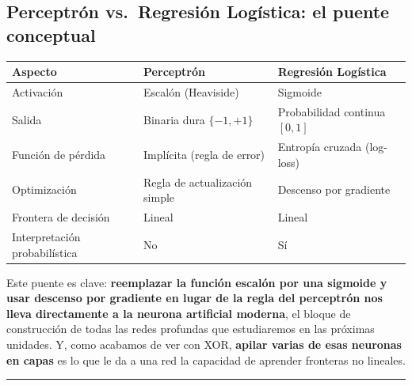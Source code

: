 \documentclass[
  letterpaper,
  DIV=11,
  numbers=noendperiod]{scrartcl}
\newcounter{none} %
\begin{document}
\subsection{Perceptrón vs.~Regresión Logística: el puente
conceptual}\label{perceptruxf3n-vs.-regresiuxf3n-loguxedstica-el-puente-conceptual}

{\def\LTcaptype{none} %
\begin{longtable}[]{@{}
  >{\raggedright\arraybackslash}p{}
  >{\raggedright\arraybackslash}p{}
  >{\raggedright\arraybackslash}p{}@{}}
\toprule\noalign{}
\begin{minipage}[b]{\linewidth}\raggedright
Aspecto
\end{minipage} & \begin{minipage}[b]{\linewidth}\raggedright
Perceptrón
\end{minipage} & \begin{minipage}[b]{\linewidth}\raggedright
Regresión Logística
\end{minipage} \\
\midrule\noalign{}
\endhead
\bottomrule\noalign{}
\endlastfoot
Activación & Escalón (Heaviside) & Sigmoide \\
Salida & Binaria dura \(\{-1,+1\}\) & Probabilidad continua \([0,1]\) \\
Función de pérdida & Implícita (regla de error) & Entropía cruzada
(log-loss) \\
Optimización & Regla de actualización simple & Descenso por gradiente \\
Frontera de decisión & Lineal & Lineal \\
Interpretación probabilística & No & Sí \\
\end{longtable}
}

Este puente es clave: \textbf{reemplazar la función escalón por una
sigmoide y usar descenso por gradiente en lugar de la regla del
perceptrón nos lleva directamente a la neurona artificial moderna}, el
bloque de construcción de todas las redes profundas que estudiaremos en
las próximas unidades. Y, como acabamos de ver con XOR, \textbf{apilar
varias de esas neuronas en capas} es lo que le da a una red la capacidad
de aprender fronteras no lineales.

\begin{center}\rule{0.5\linewidth}{0.5pt}\end{center}
\end{document}
